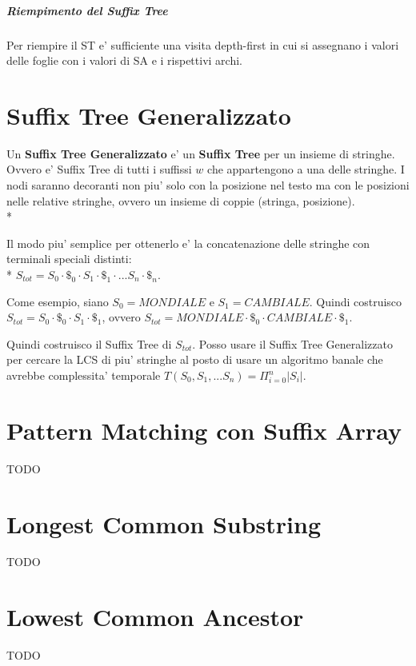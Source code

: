\subparagraph{Riempimento del Suffix Tree}

Per riempire il ST e' sufficiente una visita depth-first in cui si assegnano i valori delle foglie con i valori di SA e i rispettivi archi.

\section{Suffix Tree Generalizzato}

Un \textbf{Suffix Tree Generalizzato} e' un \textbf{Suffix Tree} per un insieme di stringhe.
Ovvero e' Suffix Tree di tutti i suffissi $w$ che appartengono a una delle stringhe.
I nodi saranno decoranti non piu' solo con la posizione nel testo ma con le posizioni nelle relative stringhe, ovvero un insieme di coppie (stringa, posizione). \\*

Il modo piu' semplice per ottenerlo e' la concatenazione delle stringhe con terminali speciali distinti: \\*
$S_{tot} = S_0 \cdot \$_0 \cdot S_1 \cdot \$_1 \cdot ... S_n \cdot \$_n$.

Come esempio, siano $S_0 = MONDIALE$ e $S_1 = CAMBIALE$.
Quindi costruisco $S_{tot} = S_0 \cdot \$_0 \cdot S_1 \cdot \$_1$, ovvero $S_{tot} = MONDIALE \cdot \$_0 \cdot CAMBIALE \cdot \$_1$.

Quindi costruisco il Suffix Tree di $S_{tot}$.
Posso usare il Suffix Tree Generalizzato per cercare la LCS di piu' stringhe al posto di usare un algoritmo banale che avrebbe complessita' temporale $T(S_0,S_1, ... S_n) = \Pi _ {i=0} ^ {n} |S_i|$.

\section{Pattern Matching con Suffix Array}

TODO

\section{Longest Common Substring}

TODO

\section{Lowest Common Ancestor}

TODO